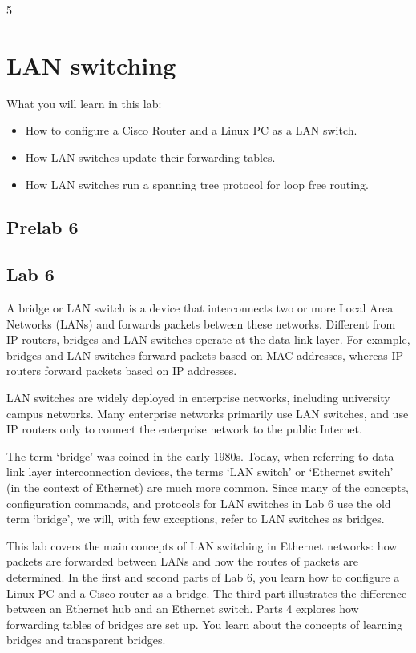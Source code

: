 
\setcounter {chapter} {5} 

\chapter{LAN switching}

What you will learn in this lab:
\begin{itemize}
	\item How to configure a Cisco Router and a Linux PC as a LAN switch.
	\item How LAN switches update their forwarding tables.
	\item How LAN switches run a spanning tree protocol for loop free routing.
\end{itemize}

\newpage
{}
\section{Prelab 6}\label{sec:prelab6}


\newpage
{}
\section{Lab 6}\label{sec:lab6}

A bridge or LAN switch is a device that interconnects two or more Local Area Networks (LANs) and forwards packets between these networks. Different from IP routers, bridges and LAN switches operate at the data link layer. For example, bridges and LAN switches forward packets based on MAC addresses, whereas IP routers forward packets based on IP addresses.

LAN switches are widely deployed in enterprise networks, including university campus networks. Many enterprise networks primarily use LAN switches, and use IP routers only to connect the enterprise network to the public Internet.

The term `bridge’ was coined in the early 1980s. Today, when referring to data-link layer interconnection devices, the terms `LAN switch’ or `Ethernet switch’ (in the context of Ethernet) are much more common. Since many of the concepts, configuration commands, and protocols for LAN switches in Lab 6 use the old term `bridge’, we will, with few exceptions, refer to LAN switches as bridges.

This lab covers the main concepts of LAN switching in Ethernet networks: how packets are forwarded between LANs and how the routes of packets are determined. In the first and second parts of Lab 6, you learn how to configure a Linux PC and a Cisco router as a bridge. The third part illustrates the difference between an Ethernet hub and an Ethernet switch. Parts 4 explores how forwarding tables of bridges are set up. You learn about the concepts of learning bridges and transparent bridges.

